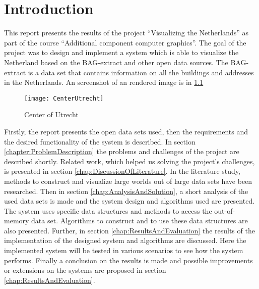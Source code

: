 \chapter{Introduction}
\label{chap:Introduction}
This report presents the results of the project “Visualizing the Netherlands” as part of the course “Additional component computer graphics”. The goal of the project was to design and implement a system which is able to visualize the Netherland based on the BAG-extract \cite{BAG14} and other open data sources. The BAG-extract is a data set that contains information on all the buildings and addresses in the Netherlands. An screenshot of an rendered image is in \ref{fig:utrechtCenter}

\begin{figure}[htb!]
\centering
\texttt{[image: CenterUtrecht]}
\caption{Center of Utrecht}
\label{fig:utrechtCenter}
\end{figure}

Firstly, the report presents the open data sets used, then the requirements and the desired functionality of the system is described. In section \ref{chapter:ProblemDescription} the problems and challenges of the project are described shortly. Related work, which helped us solving the project’s challenges, is presented in section \ref{chap:DiscussionOfLiterature}. In the literature study, methods to construct and visualize large worlds out of large data sets have been researched. Then in section \ref{chap:AnalysisAndSolution}, a short analysis of the used data sets is made and the system design and algorithms used are presented. The system uses specific data structures and methods to access the out-of-memory data set. Algorithms to construct and to use these data structures are also presented. Further, in section \ref{chap:ResultsAndEvaluation} the results of the implementation of the designed system and algorithms are discussed. Here the implemented system will be tested in various scenarios to see how the system performs. Finally a conclusion on the results is made and possible improvements or extensions on the systems are proposed in section \ref{chap:ResultsAndEvaluation}.

